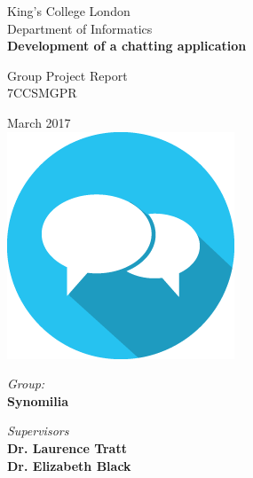 \documentclass[10pt,a4paper,oneside]{report}
\author{Synomilia}
\begin{document}
\thispagestyle{empty}

\begin{center}
\large
King's College London\\
Department of Informatics\\[2cm]

{\huge \bfseries Development of a chatting application}\\[2cm]

\begin{center}
	\Large Group Project Report \\%
	7CCSMGPR 
\end{center}

March 2017\\[2cm]

\includegraphics[width=.4\linewidth]{chat-2-icon.png}\\[4cm]

\begin{minipage}{.49\textwidth}
	\begin{flushleft}
		\textit{Group:}\\
		\textbf{Synomilia}\\
	\end{flushleft}
\end{minipage}
\begin{minipage}{.49\textwidth}
	\begin{flushright}
			\textit{Supervisors}\\ 
			\textbf{Dr. Laurence Tratt}\\
			\textbf{Dr. Elizabeth Black} 
	\end{flushright}
\end{minipage}

\end{center}

\tableofcontents










\begin{appendices}



\end{appendices}

%
\end{document}
